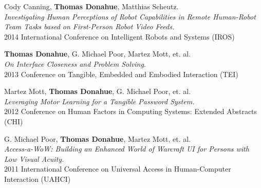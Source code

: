 \documentclass[10pt, letter]{article}
\newcommand{\years}[1]{\marginnote{\footnotesize #1}}
\begin{document}
\vspace{.2cm}
\years{2014}
Cody Canning, \textbf{Thomas Donahue}, Matthias Scheutz. \\
\textsl{Investigating Human Perceptions of Robot Capabilities in
  Remote Human-Robot Team Tasks based on First-Person Robot Video
  Feeds.} \\
2014 International Conference on Intelligent Robots and Systems
(IROS)

\vspace{.2cm}
\years{2013} 
\textbf{Thomas Donahue}, G. Michael Poor, Martez Mott, et. al. \\
\textsl{On Interface Closeness and Problem Solving.} \\
2013 Conference on Tangible, Embedded and Embodied Interaction
(TEI)

\vspace{.2cm}
\years{2012} 
Martez Mott, \textbf{Thomas Donahue}, G. Michael Poor, et. al. \\
\textsl{Leveraging Motor Learning for a Tangible Password System.} \\
2012 Conference on Human Factors in Computing Systems: Extended Abstracts
(CHI)

\vspace{.2cm}
\years{2011} 
G. Michael Poor, \textbf{Thomas Donahue}, Martez Mott, et. al. \\
\textsl{Access-a-WoW: Building an Enhanced World of Warcraft
  \uppercase{UI} for Persons with Low Visual Acuity.} \\
2011 International Conference on Universal Access in Human-Computer
Interaction (UAHCI)

\end{document}
